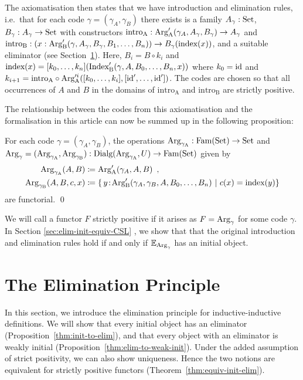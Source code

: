 \documentclass[orivec,envcountsame, ,envcountsect]{llncs}
\begin{document}
The axiomatisation then states that we have introduction and
elimination rules, i.e.\ that for each code $\gamma = (\gamma_A,
\gamma_B)$ there exists is a family $A_\gamma : \text{Set}$, $B_\gamma :
A_\gamma \to \text{Set}$ with constructors $\text{intro}_{\text{A}} :
\text{Arg}_{\text{A}}'(\gamma_A, A_\gamma, B_\gamma) \to A_\gamma$ and
$\text{intro}_{\text{B}} : (x : \text{Arg}_{\text{B}}'(\gamma, A_\gamma, B_\gamma,
B_1, \ldots, B_n)) \to B_\gamma(\text{index}(x))$, and a suitable
eliminator (see Section~\ref{sec:eliminator}). Here, $B_i = B \circ
k_i$ and $\text{index}(x) = [k_0,
  \ldots, k_n](\text{Index}'_{\text{B}}(\gamma, A, B_0, \ldots, B_n, x))$ where $k_0
= \text{id}$ and $k_{i+1} = \text{intro}_{\text{A}} \circ
\text{Arg}_{\text{A}}'^i([k_0, \ldots, k_{i}], [\text{id}',
  \ldots, \text{id}'])$. The codes are chosen so that all occurrences of $A$
and $B$ in the domains of $\text{intro}_{\text{A}}$ and
$\text{intro}_{\text{B}}$ are strictly positive.

The relationship between the codes from this axiomatisation and the formalisation in this article can now be summed up in the following proposition:
\begin{proposition}
  For each code $\gamma = (\gamma_A, \gamma_B)$, the operations $\text{Arg}_{\gamma_\text{A}} : \text{Fam}(\text{Set}) \to \text{Set}$ and $\text{Arg}_{\gamma} = (\text{Arg}_{\gamma_\text{A}}, \text{Arg}_{\gamma_\text{B}}) : \text{Dialg}(\text{Arg}_{\gamma_\text{A}}, U) \to \text{Fam}(\text{Set})$ given by
\begin{align*}
\text{Arg}_{\gamma_\text{A}}(A, B) &\coloneqq \text{Arg}_{\text{A}}'(\gamma_A, A, B) \enspace ,\\
\text{Arg}_{\gamma_\text{B}}(A, B, c, x) &\coloneqq \{\, y\!:\!\text{Arg}_{\text{B}}'(\gamma_A, \gamma_B, A, B_0, \ldots, B_n)
                                                \ |\  c(x) = \text{index}(y) \}
\end{align*}
are functorial. \qed %
\end{proposition}
%
We will call a functor $F$ strictly positive if it arises as $F = \text{Arg}_{\gamma}$ for some code $\gamma$. In Section
\ref{sec:elim-init-equiv-CSL}
, we show that that the original
introduction and elimination rules hold
if and only if $\mathbb{E}_{\text{Arg}_{\gamma}}$ has an initial object.
  

\section{The Elimination Principle}
\label{sec:eliminator}

In this section, we introduce the elimination principle for
inductive-inductive definitions. We will show that every initial
object has an eliminator (Proposition~\ref{thm:init-to-elim}), and
that every object with an eliminator is weakly initial
(Proposition~\ref{thm:elim-to-weak-init}). Under the added assumption
of strict positivity, we can also show uniqueness. Hence the two
notions are equivalent for strictly positive functors
(Theorem~\ref{thm:equiv-init-elim}).
\end{document}
